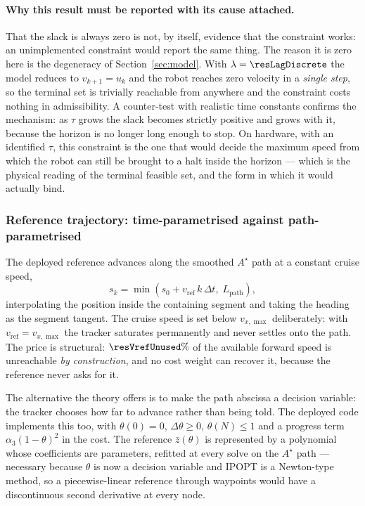 \documentclass[11pt,a4paper]{article}
\newcommand{\astar}{$A^\star$}
\begin{document}
\paragraph{Why this result must be reported with its cause attached.} That the slack is always zero is not,
by itself, evidence that the constraint works: an unimplemented constraint would report the same thing. The
reason it is zero here is the degeneracy of Section~\ref{sec:model}. With $\lambda=\resLagDiscrete$ the model
reduces to $v_{k+1}=u_k$ and the robot reaches zero velocity in a \emph{single step}, so the terminal set is
trivially reachable from anywhere and the constraint costs nothing in admissibility. A counter-test with
realistic time constants confirms the mechanism: as $\tau$ grows the slack becomes strictly positive and
grows with it, because the horizon is no longer long enough to stop. On hardware, with an identified $\tau$,
this constraint is the one that would decide the maximum speed from which the robot can still be brought to a
halt inside the horizon --- which is the physical reading of the terminal feasible set, and the form in which
it would actually bind.

\subsubsection{Reference trajectory: time-parametrised against path-parametrised}
\label{sec:pathfollow}

The deployed reference advances along the smoothed \astar{} path at a constant cruise speed,
\begin{equation}
  s_k=\min\!\left(s_0+v_{\mathrm{ref}}\,k\,\Delta t,\; L_{\mathrm{path}}\right),
  \label{eq:ref}
\end{equation}
interpolating the position inside the containing segment and taking the heading as the segment tangent. The
cruise speed is set below $v_{x,\max}$ deliberately: with $v_{\mathrm{ref}}=v_{x,\max}$ the tracker saturates
permanently and never settles onto the path. The price is structural: $\resVrefUnused\%$ of the available
forward speed is unreachable \emph{by construction}, and no cost weight
can recover it, because the reference never asks for it.

The alternative the theory offers is to make the path abscissa a decision variable: the tracker chooses how
far to advance rather than being told. The deployed code implements this too, with $\theta(0)=0$,
$\Delta\theta\ge0$, $\theta(N)\le1$ and a progress term $\alpha_3(1-\theta)^2$ in the cost. The reference
$\bar z(\theta)$ is represented by a polynomial whose coefficients are parameters, refitted at every solve on
the \astar{} path --- necessary because $\theta$ is now a decision variable and IPOPT is a Newton-type
method, so a piecewise-linear reference through waypoints would have a discontinuous second derivative at
every node.
\end{document}

